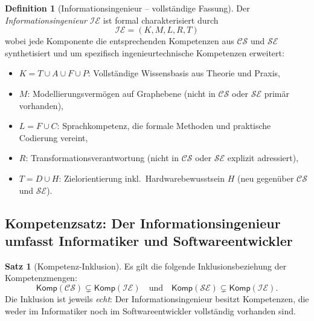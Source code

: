 ﻿\documentclass[a4paper,12pt]{article}
\theoremstyle{definition}
\newtheorem{definition}{Definition}
\newtheorem{satz}{Satz}
\begin{document}
\begin{definition}[Informationsingenieur -- vollständige Fassung]
\label{def:infeng2}
Der \emph{Informationsingenieur} $\mathcal{IE}$ ist formal charakterisiert durch
\[
  \mathcal{IE} = (K, M, L, R, T)
\]
wobei jede Komponente die entsprechenden Kompetenzen aus $\mathcal{CS}$ und
$\mathcal{SE}$ synthetisiert und um spezifisch ingenieurtechnische Kompetenzen erweitert:
\begin{itemize}
  \item $K = T \cup A \cup F \cup P$: Vollständige Wissensbasis aus Theorie und Praxis,
  \item $M$: Modellierungsvermögen auf Graphebene (nicht in $\mathcal{CS}$ oder $\mathcal{SE}$
        primär vorhanden),
  \item $L = F \cup C$: Sprachkompetenz, die formale Methoden und praktische Codierung vereint,
  \item $R$: Transformationsverantwortung (nicht in $\mathcal{CS}$ oder $\mathcal{SE}$
        explizit adressiert),
  \item $T = D \cup H$: Zielorientierung inkl.\ Hardwarebewusstsein $H$ (neu gegenüber $\mathcal{CS}$
        und $\mathcal{SE}$).
\end{itemize}
\end{definition}

\subsection{Kompetenzsatz: Der Informationsingenieur umfasst Informatiker und Softwareentwickler}

\begin{satz}[Kompetenz-Inklusion]
\label{satz:inklusion}
Es gilt die folgende Inklusionsbeziehung der Kompetenzmengen:
\[
  \mathsf{Komp}(\mathcal{CS}) \subsetneq \mathsf{Komp}(\mathcal{IE})
  \quad \text{und} \quad
  \mathsf{Komp}(\mathcal{SE}) \subsetneq \mathsf{Komp}(\mathcal{IE}).
\]
Die Inklusion ist jeweils \emph{echt}: Der Informationsingenieur besitzt Kompetenzen,
die weder im Informatiker noch im Softwareentwickler vollständig vorhanden sind.
\end{satz}
\end{document}
